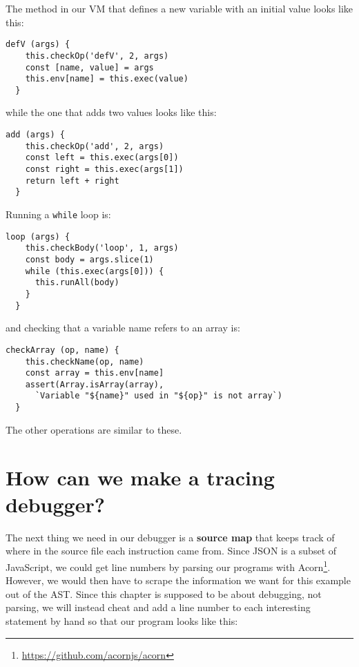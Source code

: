 \documentclass[krantzl]{krantz}
\newcommand{\glossref}[1]{\textbf{#1}}
\newcommand{\hreffoot}[2]{{#1}\footnote{\href{#2}{#2}}}
\begin{document}
The method in our VM that defines a new variable with an initial value looks like this:


\begin{lstlisting}[frame=tblr]
  defV (args) {
    this.checkOp('defV', 2, args)
    const [name, value] = args
    this.env[name] = this.exec(value)
  }
\end{lstlisting}



\noindent while the one that adds two values looks like this:


\begin{lstlisting}[frame=tblr]
  add (args) {
    this.checkOp('add', 2, args)
    const left = this.exec(args[0])
    const right = this.exec(args[1])
    return left + right
  }
\end{lstlisting}



Running a \texttt{while} loop is:


\begin{lstlisting}[frame=tblr]
  loop (args) {
    this.checkBody('loop', 1, args)
    const body = args.slice(1)
    while (this.exec(args[0])) {
      this.runAll(body)
    }
  }
\end{lstlisting}



\noindent and checking that a variable name refers to an array is:


\begin{lstlisting}[frame=tblr]
  checkArray (op, name) {
    this.checkName(op, name)
    const array = this.env[name]
    assert(Array.isArray(array),
      `Variable "${name}" used in "${op}" is not array`)
  }
\end{lstlisting}



The other operations are similar to these.

\section{How can we make a tracing debugger?}\label{debugger-tracing}


The next thing we need in our debugger is
a \glossref{source map} that keeps track of
where in the source file each instruction came from.
Since JSON is a subset of JavaScript,
we could get line numbers by parsing our programs with \hreffoot{Acorn}{https://github.com/acornjs/acorn}.
However,
we would then have to scrape the information we want for this example out of the AST.
Since this chapter is supposed to be about debugging,
not parsing,
we will instead cheat and add a line number to each interesting statement by hand
so that our program looks like this:
\end{document}
